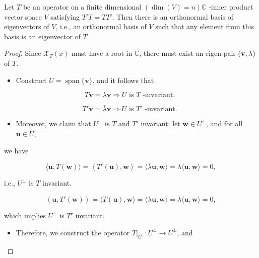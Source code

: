\begin{theorem}\label{thm:spectral-normal} Let \(T\) be an operator on a finite dimensional \(\left( {\dim \left( V\right)  = n}\right) \mathbb{C}\) -inner product vector space \(V\) satisfying \(T'T = TT'\). Then there is an orthonormal basis of eigenvectors of \(V\), i.e., an orthonormal basis of \(V\) such that any element from this basis is an eigenvector of \(T\).
\end{theorem}
\begin{proof} Since \({\mathcal{X}}_{T}\left( x\right)\) must have a root in \(\mathbb{C}\), there must exist an eigen-pair \(\left( {{\bf v},\lambda }\right)\) of \(T\).

\begin{itemize}
\item Construct \(U = \operatorname{span}\{ \mathbf{v}\}\), and it follows that
\end{itemize}

\[
T\mathbf{v} = \lambda \mathbf{v} \Rightarrow  U\text{ is }T\text{ -invariant. }
\]

\[
T'\mathbf{v} = \bar{\lambda }\mathbf{v} \Rightarrow  U\text{ is }T'\text{ -invariant. }
\]

\begin{itemize}
\item Moreover, we claim that \({U}^{ \bot  }\) is \(T\) and \(T'\) invariant: let \(\mathbf{w} \in  {U}^{ \bot  }\), and for all \(\mathbf{u} \in  U\),
\end{itemize}

we have

\[
\langle \mathbf{u},T\left( \mathbf{w}\right) \rangle  = \left\langle  {T'\left( \mathbf{u}\right) ,\mathbf{w}}\right\rangle   = \langle \bar{\lambda }\mathbf{u},\mathbf{w}\rangle  = \lambda \langle \mathbf{u},\mathbf{w}\rangle  = 0,
\]

i.e., \({U}^{ \bot  }\) is \(T\) invariant.

\[
\left\langle  {\mathbf{u},T'\left( \mathbf{w}\right) }\right\rangle   = \langle T\left( \mathbf{u}\right) ,\mathbf{w}\rangle  = \langle \lambda \mathbf{u},\mathbf{w}\rangle  = \bar{\lambda }\langle \mathbf{u},\mathbf{w}\rangle  = 0,
\]

which implies \({U}^{ \bot  }\) is \(T'\) invariant.

\begin{itemize}
\item Therefore, we construct the operator \({\left. T\right| }_{{U}^{ \bot  }} : {U}^{ \bot  } \rightarrow  {U}^{ \bot  }\), and
\end{itemize}


\end{proof}
